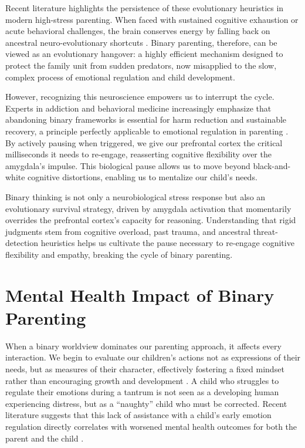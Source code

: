 Recent literature highlights the persistence of these evolutionary heuristics in modern high-stress parenting.
When faced with sustained cognitive exhaustion or acute behavioral challenges, the brain conserves energy by falling back on ancestral neuro-evolutionary shortcuts \citep{peterson2026}.
Binary parenting, therefore, can be viewed as an evolutionary hangover: a highly efficient mechanism designed to protect the family unit from sudden predators, now misapplied to the slow, complex process of emotional regulation and child development.

However, recognizing this neuroscience empowers us to interrupt the cycle.
Experts in addiction and behavioral medicine increasingly emphasize that abandoning binary frameworks is essential for harm reduction and sustainable recovery, a principle perfectly applicable to emotional regulation in parenting \citep{manietta2025}.
By actively pausing when triggered, we give our prefrontal cortex the critical milliseconds it needs to re-engage, reasserting cognitive flexibility over the amygdala's impulse.
This biological pause allows us to move beyond black-and-white cognitive distortions, enabling us to mentalize our child's needs.

\begin{keyinsight}
Binary thinking is not only a neurobiological stress response but also an evolutionary survival strategy, driven by amygdala activation that momentarily overrides the prefrontal cortex's capacity for reasoning.
Understanding that rigid judgments stem from cognitive overload, past trauma, and ancestral threat-detection heuristics helps us cultivate the pause necessary to re-engage cognitive flexibility and empathy, breaking the cycle of binary parenting.
\end{keyinsight}


\section{Mental Health Impact of Binary Parenting}

When a binary worldview dominates our parenting approach, it affects every interaction.
We begin to evaluate our children's actions not as expressions of their needs, but as measures of their character, effectively fostering a fixed mindset rather than encouraging growth and development \citep{dweck2006}.
A child who struggles to regulate their emotions during a tantrum is not seen as a developing human experiencing distress, but as a ``naughty'' child who must be corrected.
Recent literature suggests that this lack of assistance with a child's early emotion regulation directly correlates with worsened mental health outcomes for both the parent and the child \citep{larionow2025}.

